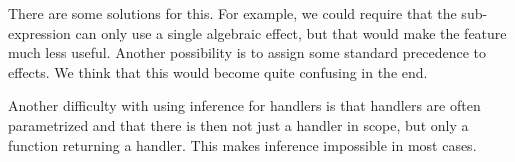 There are some solutions for this. For example, we could require that the sub-expression can only use a single algebraic effect, but that would make the feature much less useful. Another possibility is to assign some standard precedence to effects. We think that this would become quite confusing in the end.

Another difficulty with using inference for handlers is that handlers are often parametrized and that there is then not just a handler in scope, but only a function returning a handler. This makes inference impossible in most cases.
